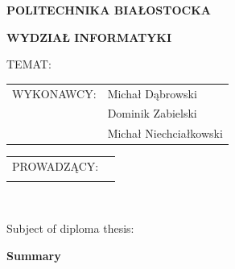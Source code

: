\begin{center}
	\fontsize{20pt}{20pt}\selectfont
	\textbf{POLITECHNIKA BIAŁOSTOCKA}
	\vspace{1.0cm}

	\fontsize{14pt}{14pt}\selectfont
	\textbf{WYDZIAŁ INFORMATYKI}
	\vspace{4.0cm}

	\fontsize{18pt}{18pt}\selectfont
	\thesisType
	\fontsize{16pt}{16pt}\selectfont

	\vspace{0.8cm}

	\fontsize{14pt}{14pt}\selectfont

	\vspace{1.6cm}

	TEMAT: \topicPL

	\vspace{1.6cm}

\end{center}
\fontsize{14pt}{14pt}\selectfont

\vspace{3,4cm}

\begin{flushright}
	\begin{tabular}{rl}
		WYKONAWCY: & Michał Dąbrowski \\
		           & Dominik Zabielski \\
				   & Michał Niechciałkowski \\
	\end{tabular}
	\vfill
\end{flushright}

\begin{flushleft}
	\begin{tabular}{rl}
		PROWADZĄCY: & \promotor \\
		            &           \\
	\end{tabular}
\end{flushleft}

\vspace{2cm}

\begin{center}
	\textbf{\thesisDate}
\end{center}

\thispagestyle{empty}

\pagebreak\ \thispagestyle{empty}

\noindent Subject of diploma thesis:

\noindent \topicEN

\thispagestyle{empty}
\begin{center}
	\Large
	\textbf{Summary}

	\normalsize
	\justify
	\summaryEN
\end{center}


\pagebreak

\thispagestyle{empty}
\thispagestyle{empty}

\pagestyle{empty}
\pagebreak

\normalsize

\pagebreak
{}
\tableofcontents
\pagebreak
